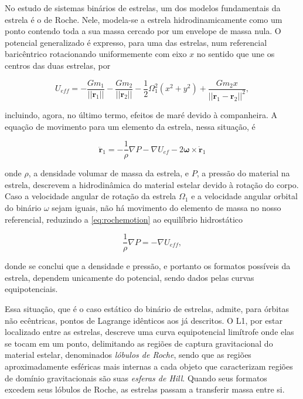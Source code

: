 No estudo de sistemas binários de estrelas, um dos modelos fundamentais da estrela é o de Roche. Nele, modela-se a estrela hidrodinamicamente como um ponto contendo toda a sua massa cercado por um envelope de massa nula. O potencial generalizado é expresso, para uma das estrelas, num referencial baricêntrico rotacionando uniformemente com eixo $x$ no sentido que une os centros das duas estrelas, por

\begin{equation}
    U_{eff} = -\frac{Gm_1}{||\mathbf{r}_1||}-\frac{Gm_2}{||\mathbf{r}_2||}-\frac{1}{2}\Omega_1^2(x^2 + y^2)+\frac{Gm_2x}{||\mathbf{r}_1 - \mathbf{r}_2||^2},
\end{equation}

incluindo, agora, no último termo, efeitos de maré devido à companheira. A equação de movimento para um elemento da estrela, nessa situação, é

\begin{equation}
    \label{eq:rochemotion}
    \ddot{\mathbf{r}}_1 = -\frac{1}{\rho}\nabla P - \nabla U_{ef} - 2\mathbf{\omega}\times\dot{\mathbf{r}}_1
\end{equation}

onde $\rho$, a densidade volumar de massa da estrela, e $P$, a pressão do material na estrela, descrevem a hidrodinâmica do material estelar devido à rotação do corpo. Caso a velocidade angular de rotação da estrela $\Omega_1$ e a velocidade angular orbital do binário $\omega$ sejam iguais, não há movimento do elemento de massa no nosso referencial, reduzindo a \ref{eq:rochemotion} ao equilíbrio hidrostático

\begin{equation}
    \label{eq:staticroche}
    \frac{1}{\rho}\nabla P = -\nabla U_{eff},
\end{equation}

donde se conclui que a densidade e pressão, e portanto os formatos possíveis da estrela, dependem unicamente do potencial, sendo dados pelas curvas equipotenciais.

Essa situação, que é o caso estático do binário de estrelas, admite, para órbitas não ecêntricas, pontos de Lagrange idênticos aos já descritos. O L1, por estar localizado entre as estrelas, descreve uma curva equipotencial limítrofe onde elas se tocam em um ponto, delimitando as regiões de captura gravitacional do material estelar, denominados \textit{lóbulos de Roche}, sendo que as regiões aproximadamente esféricas mais internas a cada objeto que caracterizam regiões de domínio gravitacionais são suas \textit{esferas de Hill}. Quando seus formatos excedem seus lóbulos de Roche, as estrelas passam a transferir massa entre si.

